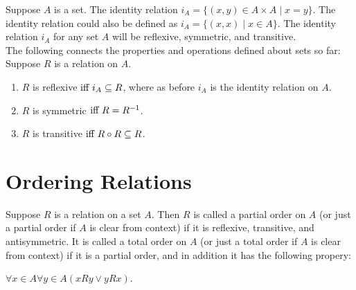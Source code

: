 \documentclass{article}
\begin{document}
\noindent Suppose $A$ is a set. The \gls{identity relation} $i_{A} = \{(x,y) \in A \times A \mid x = y \}$. The identity relation could also be defined as $i_{A} = \{(x,x) \mid x \in A \}$. The identity relation $i_{A}$ for any set $A$ will be reflexive, symmetric, and transitive.\\

\noindent The following connects the properties and operations defined about sets so far:\\
Suppose $R$ is a relation on $A$.
\begin{enumerate}
    \item $R$ is reflexive$\text{ iff } i_{A} \subseteq R$, where as before $i_{A}$ is the identity relation on $A$.
    \item $R$ is symmetric$\text{ iff } R = R^{-1}$.
    \item $R$ is transitive$\text{ iff } R \circ R \subseteq R$.
\end{enumerate}

\section{Ordering Relations}
Suppose $R$ is a relation on a set $A$. Then $R$ is called a \gls{partial order} on $A$ (or just a partial order if $A$ is clear from context) if it is reflexive, transitive, and antisymmetric. It is called a \gls{total order} on $A$ (or just a total order if $A$ is clear from context) if it is a partial order, and in addition it has the following propery:
\begin{center}
    $\forall x \in A \forall y \in A(xRy \lor yRx)$.
\end{center}


\clearpage
\printglossary[type=\acronymtype,style=long]  %
\printglossary[type=symbolslist,style=long]   %
\printglossary[type=main]                     %
\end{document}
